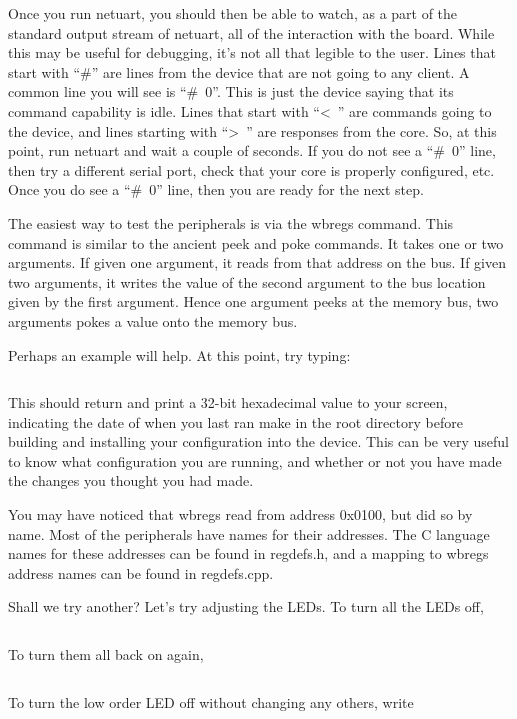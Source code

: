 \documentclass{gqtekspec}
\begin{document}
Once you run netuart, you should then be able to watch, as a part of the
standard output stream of netuart, all of the interaction with the board.
While this may be useful for debugging, it's not all that legible to the
user.   Lines that start with \hbox{``\#''} are lines from the device that are not
going to any client.  A common line you will see is \hbox{``\# 0''}.  This is
just the device saying that its command capability is idle.  Lines that start
with \hbox{``< ''} are commands going to the device, and lines starting with
\hbox{``> ''} are responses from the core.  So, at this point, run netuart and
wait a couple of seconds.  If you do not see a \hbox{``\# 0''} line, then try a
different serial port, check that your core is properly configured, etc.  Once
you do see a \hbox{``\# 0''} line, then you are ready for the next step.

The easiest way to test the peripherals is via the wbregs command.  This
command is similar to the ancient peek and poke commands.  It takes one
or two arguments.  If given one argument, it reads from that address on the
bus.  If given two arguments, it writes the value of the second argument to
the bus location given by the first argument.  Hence one argument peeks
at the memory bus, two arguments pokes a value onto the memory bus.

Perhaps an example will help.  At this point, try typing:

\begin{lstlisting}[language=bash]
% wbregs version
\end{lstlisting}

This should return and print a 32-bit hexadecimal value to your screen,
indicating the date of when you last ran make in the root directory before
building and installing your configuration into the device.  This can be
very useful to know what configuration you are running, and whether or not
you have made the changes you thought you had made.

You may have noticed that wbregs read from address 0x0100, but did so by name.
Most of the peripherals have names for their addresses.  The C language
names for these addresses can be found in regdefs.h, and a mapping to 
wbregs address names can be found in regdefs.cpp.

Shall we try another?  Let's try adjusting the LEDs.  To turn all the LEDs off, 
\begin{lstlisting}[language=bash]
% wbregs leds 0x0f0
\end{lstlisting}
To turn them all back on again,
\begin{lstlisting}[language=bash]
% wbregs leds 0x0ff
\end{lstlisting}
To turn the low order LED off without changing any others, write
\begin{lstlisting}[language=bash]
% wbregs leds 0x010
\end{lstlisting}
\end{document}
